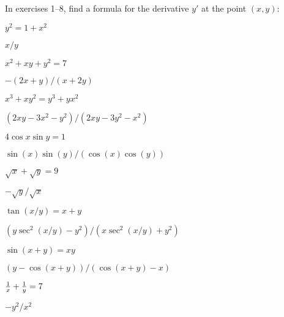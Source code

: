 \begin{exercises}

In exercises 1--8, find a formula for the derivative $y'$ at the point
$(x,y)$:

\begin{exercise} $y^2=1+x^2$
\begin{answer} $x/y$
\end{answer}\end{exercise}

\begin{exercise} $x^2+xy+y^2=7$
\begin{answer} $-(2x+y)/(x+2y)$
\end{answer}\end{exercise}

\begin{exercise} $x^3+xy^2=y^3+yx^2$
\begin{answer} $(2xy-3x^2-y^2)/(2xy-3y^2-x^2)$
\end{answer}\end{exercise}

\begin{exercise}  $4\cos x \sin y = 1$
\begin{answer} $\sin(x)\sin(y)/(\cos(x)\cos(y))$
\end{answer}\end{exercise}

\begin{exercise} $\sqrt{x} + \sqrt{y} = 9$
\begin{answer} $-\sqrt{y}/\sqrt{x}$
\end{answer}\end{exercise}

\begin{exercise} $\tan(x/y) = x+ y$
 \begin{answer} $(y\sec^2(x/y)-y^2)/(x\sec^2(x/y)+y^2)$
\end{answer}\end{exercise}

\begin{exercise} $\sin (x+y ) =xy$
 \begin{answer} $(y-\cos(x+y))/(\cos(x+y)-x)$
\end{answer}\end{exercise}

\begin{exercise} ${1\over x} + {1\over y} = 7$
\begin{answer} $-y^2/x^2$
\end{answer}\end{exercise}


\end{exercises}
